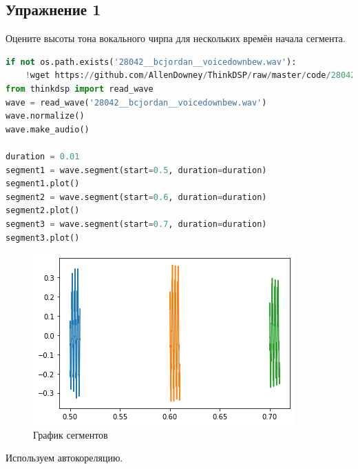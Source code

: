 \subsection{Упражнение 1}

Оцените высоты тона вокального чирпа для нескольких времён начала сегмента.

\begin{lstlisting}[language=Python]
if not os.path.exists('28042__bcjordan__voicedownbew.wav'):
    !wget https://github.com/AllenDowney/ThinkDSP/raw/master/code/28042__bcjordan__voicedownbew.wav
from thinkdsp import read_wave
wave = read_wave('28042__bcjordan__voicedownbew.wav')
wave.normalize()
wave.make_audio()

duration = 0.01
segment1 = wave.segment(start=0.5, duration=duration)
segment1.plot()
segment2 = wave.segment(start=0.6, duration=duration)
segment2.plot()
segment3 = wave.segment(start=0.7, duration=duration)
segment3.plot()
\end{lstlisting}
\begin{figure}[H]
	\begin{center}
		\includegraphics[scale=1]{fig/lab05/lab05_1.png}
		\caption{График сегментов}
	\end{center}
\end{figure}

Используем автокореляцию.

